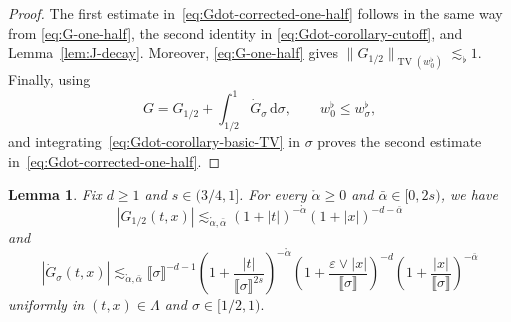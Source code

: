 \documentclass{article}
\numberwithin{equation}{section}
\newcommand{\mathd}{\mathrm{d}}
\theoremstyle{plain}
\newtheorem{lemma}[theorem]{Lemma}
\theoremstyle{definition}
\begin{document}
\begin{proof}
	The first estimate in~\eqref{eq:Gdot-corrected-one-half} follows in the
	same way from \eqref{eq:G-one-half}, the second identity in
	\eqref{eq:Gdot-corollary-cutoff}, and Lemma~\ref{lem:J-decay}.  Moreover,
	\eqref{eq:G-one-half} gives
	\(\|G_{1/2}\|_{\operatorname{TV}(w_0^\flat)}\lesssim_\flat1\).
	Finally, using
	\[
	G=G_{1/2}+\int_{1/2}^1\dot G_\sigma\,\mathd\sigma,
	\qquad
	w_0^\flat\leq w_\sigma^\flat,
	\]
	and integrating~\eqref{eq:Gdot-corollary-basic-TV} in \(\sigma\) proves
	the second estimate in~\eqref{eq:Gdot-corrected-one-half}.
\end{proof}

\begin{lemma}
  \label{lem:Gdot-decay-old}
  Fix \(d\ge1\) and \(s\in(3/4,1]\). For every $\mathring\alpha\geq 0$ and $\bar\alpha \in [0, 2 s)$, we have
  \begin{equation}
  	\left|G_{1/2}(t,x)\right|
  	\lesssim_{\mathring\alpha,\bar\alpha}
  	(1+|t|)^{-\mathring\alpha}
  	(1+|x|)^{-d-\bar\alpha}
  	\label{eq:G-one-half}
  \end{equation}
  and
  \begin{equation}
  	\left|\dot G_\sigma(t,x)\right|
  	\lesssim_{\mathring\alpha,\bar\alpha}
  	\llbracket\sigma\rrbracket^{-d-1}
  	\left(
  	1+\frac{|t|}{\llbracket\sigma\rrbracket^{2s}}
  	\right)^{-\mathring\alpha}
  	\left(
  	1+\frac{\varepsilon\vee|x|}
  	{\llbracket\sigma\rrbracket}
  	\right)^{-d}
  	\left(
  	1+\frac{|x|}{\llbracket\sigma\rrbracket}
  	\right)^{-\bar\alpha}
  	\label{eq:Gdot-bound}
  \end{equation}
  uniformly in $(t, x) \in \Lambda$ and $\sigma \in [1 / 2, 1) .$
\end{lemma}
\end{document}
